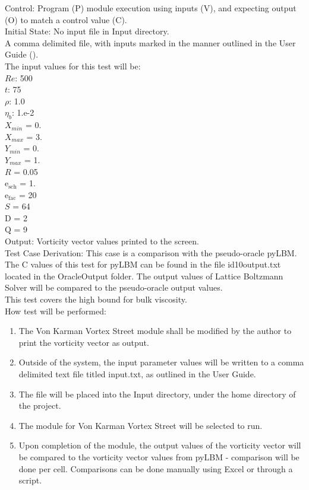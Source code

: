 \documentclass[12pt, titlepage]{article}
\newcommand{\famname}{Lattice Boltzmann Solver}
\begin{document}
\begin{enumerate}
Control: Program (P) module execution using inputs (V), and expecting output (O) to match a control value (C).\\
					
Initial State: No input file in Input directory.\\
					
A comma delimited file, with inputs marked in the manner outlined in the User
Guide (\citet{LBM_UserGuide_PM}).\\The input values for this test will be:\\
$Re$: 500\\
$t$: 75\\
$\rho$: 1.0\\
$\eta_b$: 1.e-2\\
$X_{min}$ = 0.\\
$X_{max}$ = 3.\\
$Y_{min}$ = 0.\\
$Y_{max}$ = 1.\\
$R$ = 0.05\\
$\mathrm{e_{sch}}$ = 1.\\
$\mathrm{e_{fac}}$ = 20\\
$S$ = 64\\
$\mathrm{D}$ = 2\\
$\mathrm{Q}$ = 9\\

Output: Vorticity vector values printed to the screen. \\ 

Test Case Derivation: This case is a comparison with the pseudo-oracle
pyLBM. The C values of this test for pyLBM can be found in the file
id10output.txt located in the OracleOutput folder. The output values of {\famname} will be compared to the pseudo-oracle output values.\\

This test covers the high bound for bulk viscosity.\\
					
How test will be performed: 

\begin{enumerate}
\item The Von Karman Vortex Street module shall be modified by the author to
  print the vorticity vector as output.
\item Outside of the system, the input parameter values will be written to a
  comma delimited text file titled input.txt, as outlined in the User Guide.
\item The file will be placed into the Input directory, under the home directory
of the project.
\item The module for Von Karman Vortex Street will be selected to run.
\item Upon completion of the module, the output values of the vorticity vector
will be compared to the vorticity vector values from pyLBM - comparison will be
done per cell. Comparisons can be done manually using Excel or through a
script.\\
\end{enumerate}

\end{enumerate}
~\newpage
\end{document}
